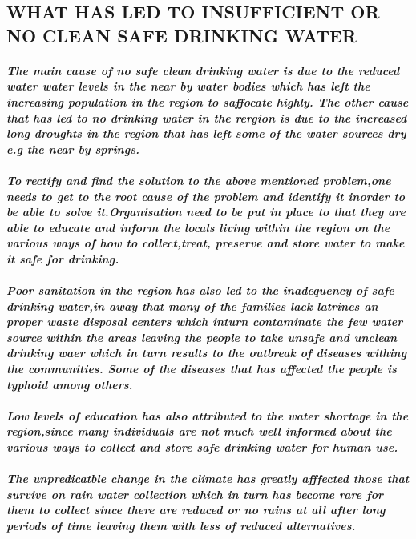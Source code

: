 \documentclass[a4paper,12pt]{article}
\begin{document}
\subsection{\sc WHAT HAS LED TO INSUFFICIENT OR NO CLEAN SAFE DRINKING WATER}
\paragraph{\sl The main cause of no safe clean drinking water is due to the reduced water water levels in the near by water bodies which has left the increasing population in the region to saffocate highly.
The other cause that has led to no drinking water in the rergion is due to the increased long droughts in the region that has left some of the water sources dry e.g the near by springs.}
\paragraph{\sl To rectify and find the solution to the above mentioned problem,one needs to get to the root cause of the problem and identify it inorder to be able to solve it.Organisation need to be put in place to that they are able to educate and inform the locals living within the region on the various ways of how to collect,treat, preserve and store water to make it safe for drinking.}
\paragraph{\sl Poor sanitation in the region has also led to the inadequency of safe drinking water,in away that many of the families lack latrines an proper waste disposal centers which inturn contaminate the few water source within the areas leaving the people to take unsafe and unclean drinking waer which in turn results to the outbreak of diseases withing the communities.
Some of the diseases that has affected the people is typhoid among others.}
\paragraph {\sl Low levels of education has also attributed to the water shortage in the region,since many individuals are not much well informed about the various ways to collect and store safe drinking water for human use.}
\paragraph{\sl The unpredicatble change in the climate has greatly afffected those that survive on rain water collection which in turn has become rare for them to collect since there are reduced or no rains at all after long periods of time leaving them with less of reduced alternatives.}
\end{document}
